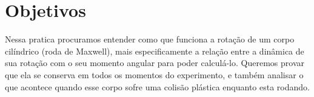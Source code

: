 \newpage
\section{Objetivos}

Nessa pratica procuramos entender como que funciona a rotação de um corpo cilíndrico (roda de Maxwell), mais especificamente a relação entre a dinâmica de sua rotação com o seu momento angular para poder calculá-lo. Queremos provar que ela se conserva em todos os momentos do experimento, e também analisar o que acontece quando esse corpo sofre uma colisão plástica enquanto esta rodando.
